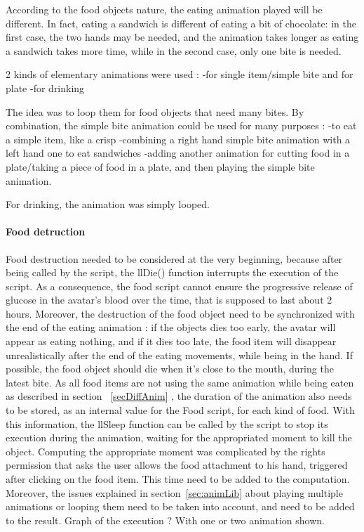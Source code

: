According to the food objects nature, the eating animation played will be different. In fact, eating a sandwich is different of eating a bit of chocolate: in the first case, the two hands may be needed, and the animation takes longer as eating a sandwich takes more time, while in the second case, only one bite is needed.

2 kinds of elementary animations were used : 
-for single item/simple bite and for plate
-for drinking

The idea was to loop them for food objects that need many bites. By combination, the simple bite animation could be used for many purposes :
-to eat a simple item, like a crisp
-combining a right hand simple bite animation with a left hand one to eat sandwiches
-adding another animation for cutting food in a plate/taking a piece of food in a plate, and then playing the simple bite animation.

For drinking, the animation was simply looped.

\paragraph{Food detruction}
\label{foodDestruction}
Food destruction needed to be considered at the very beginning, because after being called by the script, the llDie() function interrupts the execution of the script. As a consequence, the food script cannot ensure the progressive release of glucose in the avatar's blood over the time, that is supposed to last about 2 hours. 
Moreover, the destruction of the food object need to be synchronized with the end of the eating animation : if the objects dies too early, the avatar will appear as eating nothing, and if it dies too late, the food item will disappear unrealistically after the end of the eating movements, while being in the hand. If possible, the food object should die when it's close to the mouth, during the latest bite. As all food items are not using the same animation while being eaten as described in section ~\ref{secDiffAnim} , the duration of the animation also needs to be stored, as an internal value for the Food script, for each kind of food. With this information, the llSleep function can be called by the script to stop its execution during the animation, waiting for the appropriated moment to kill the object. 
Computing the appropriate moment was complicated by the rights permission that asks the user allows the food attachment to his hand, triggered after clicking on the food item. This time need to be added to the computation. Moreover, the issues explained in section~\ref{sec:animLib} about playing multiple animations or looping them need to be taken into account, and need to be added to the result. Graph of the execution ? With one or two animation shown. %


